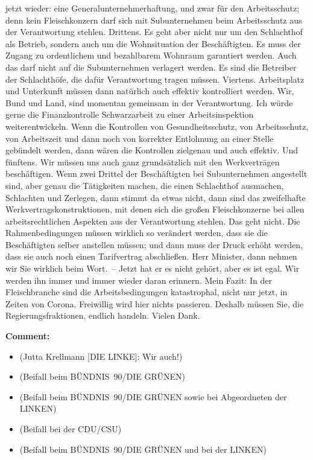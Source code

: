\documentclass{article}
\begin{document}
jetzt wieder: eine Generalunternehmerhaftung, und zwar für den Arbeitsschutz; denn kein Fleischkonzern darf sich mit Subunternehmen beim Arbeitsschutz aus der Verantwortung stehlen.  Drittens. Es geht aber nicht nur um den Schlachthof als Betrieb, sondern auch um die Wohnsituation der Beschäftigten. Es muss der Zugang zu ordentlichem und bezahlbarem Wohnraum garantiert werden. Auch das darf nicht auf die Subunternehmen verlagert werden. Es sind die Betreiber der Schlachthöfe, die dafür Verantwortung tragen müssen.  Viertens. Arbeitsplatz und Unterkunft müssen dann natürlich auch effektiv kontrolliert werden. Wir, Bund und Land, sind momentan gemeinsam in der Verantwortung. Ich würde gerne die Finanzkontrolle Schwarzarbeit zu einer Arbeitsinspektion weiterentwickeln. Wenn die Kontrollen von Gesundheitsschutz, von Arbeitsschutz, von Arbeitszeit und dann noch von korrekter Entlohnung an einer Stelle gebündelt werden, dann wären die Kontrollen zielgenau und auch effektiv.  Und fünftens. Wir müssen uns auch ganz grundsätzlich mit den Werkverträgen beschäftigen. Wenn zwei Drittel der Beschäftigten bei Subunternehmen angestellt sind, aber genau die Tätigkeiten machen, die einen Schlachthof ausmachen, Schlachten und Zerlegen, dann stimmt da etwas nicht, dann sind das zweifelhafte Werkvertragskonstruktionen, mit denen sich die großen Fleischkonzerne bei allen arbeitsrechtlichen Aspekten aus der Verantwortung stehlen. Das geht nicht. Die Rahmenbedingungen müssen wirklich so verändert werden, dass sie die Beschäftigten selber anstellen müssen; und dann muss der Druck erhöht werden, dass sie auch noch einen Tarifvertrag abschließen. Herr Minister, dann nehmen wir Sie wirklich beim Wort. – Jetzt hat er es nicht gehört, aber es ist egal. Wir werden ihn immer und immer wieder daran erinnern.  Mein Fazit: In der Fleischbranche sind die Arbeitsbedingungen katastrophal, nicht nur jetzt, in Zeiten von Corona. Freiwillig wird hier nichts passieren. Deshalb müssen Sie, die Regierungsfraktionen, endlich handeln. Vielen Dank.  

\noindent\textbf{Comment:}
\begin{itemize}
    \setlength\itemsep{-3pt}
    \item (Jutta Krellmann [DIE LINKE]: Wir auch!)
    \setlength\itemsep{-3pt}
    \item (Beifall beim BÜNDNIS 90/DIE GRÜNEN)
    \setlength\itemsep{-3pt}
    \item (Beifall beim BÜNDNIS 90/DIE GRÜNEN sowie bei Abgeordneten der LINKEN)
    \setlength\itemsep{-3pt}
    \item (Beifall bei der CDU/CSU)
    \setlength\itemsep{-3pt}
    \item (Beifall beim BÜNDNIS 90/DIE GRÜNEN und bei der LINKEN)
\end{itemize}
\end{document}
